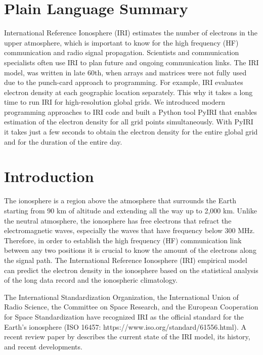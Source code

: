 \documentclass[draft]{agujournal2019}
\begin{document}
\section*{Plain Language Summary}
International Reference Ionosphere (IRI) estimates the number of electrons in the upper atmosphere, which is important to know for the high frequency (HF) communication and radio signal propagation. Scientists and communication specialists often use IRI to plan future and ongoing communication links. The IRI model, was written in late 60th, when arrays and matrices were not fully used due to the punch-card approach to programming. For example, IRI evaluates electron density at each geographic location separately. This why it takes a long time to run IRI for high-resolution global grids. We introduced modern programming approaches to IRI code and built a Python tool PyIRI that enables estimation of the electron density for all grid points simultaneously. With PyIRI it takes just a few seconds to obtain the electron density for the entire global grid and for the duration of the entire day. 


\section{Introduction}

The ionosphere is a region above the atmosphere that surrounds the Earth starting from 90 km of altitude and extending all the way up to 2,000 km. Unlike the neutral atmosphere, the ionosphere has free electrons that refract the electromagnetic waves, especially the waves that have frequency below 300 MHz. Therefore, in order to establish the high frequency (HF) communication link between any two positions it is crucial to know the amount of the electrons along the signal path. The International Reference Ionosphere (IRI) empirical model can predict the electron density in the ionosphere based on the statistical analysis of the long data record and the ionospheric climatology. 

The International Standardization Organization, the International Union of Radio Science, the Committee on Space Research, and the European Cooperation for Space Standardization have recognized IRI as the official standard for the Earth's ionosphere (ISO 16457: https://www.iso.org/standard/61556.html). A recent review paper by  describes the current state of the IRI model, its history, and recent developments.
\end{document}
